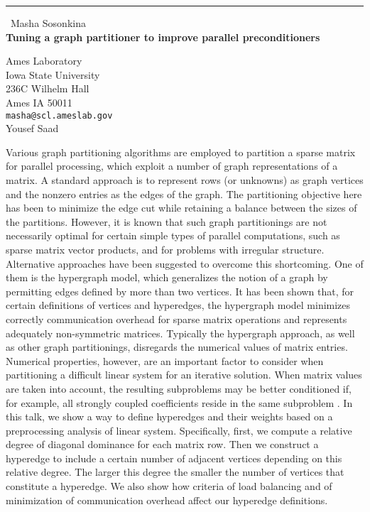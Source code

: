 \documentclass{report}
\begin{document}
\begin{center}
\rule{6in}{1pt} \
{\large Masha Sosonkina \\
{\bf Tuning a graph partitioner to improve parallel preconditioners}}

Ames Laboratory  \\ Iowa State University \\ 236C Wilhelm Hall \\ Ames IA 50011
\\
{\tt masha@scl.ameslab.gov}\\
Yousef Saad\end{center}

Various graph partitioning algorithms are employed to partition a
sparse matrix for parallel processing, which exploit a number of graph
representations of a matrix. A standard approach is to represent rows
(or unknowns) as graph vertices and the nonzero entries as the edges
of the graph. The partitioning objective here has been to minimize the
edge cut while retaining a balance between the sizes of the
partitions. However, it is known \cite{hendrickson00graph} that such
graph partitionings are not necessarily optimal for certain simple
types of parallel computations, such as sparse matrix vector
products, and for problems with irregular structure.
Alternative approaches have been suggested to overcome this
shortcoming.
One of them is the hypergraph model, which generalizes the notion of a
graph by permitting edges defined by more than two vertices.
It has been shown that, for certain definitions of vertices and
hyperedges, the hypergraph model minimizes correctly
communication overhead for sparse matrix operations and
represents adequately non-symmetric matrices. Typically the
hypergraph approach, as well as other graph partitionings, disregards
the numerical values of matrix entries.
Numerical properties, however, are an important factor to
consider when partitioning a difficult linear system for an iterative
solution.
When matrix values are taken into account, the resulting subproblems may
be better conditioned if, for example, all strongly coupled coefficients
reside in the same subproblem \cite{saad-sosonkina-acpc99}. In this
talk, we show a way to define hyperedges and their weights based
on a preprocessing analysis of linear system. Specifically, first,
we compute a relative degree of diagonal dominance for each matrix
row. Then we construct a hyperedge to include a certain number of
adjacent vertices depending on this relative degree. The larger this
degree the smaller the number of vertices that constitute a
hyperedge. We also show how criteria of load
balancing and of minimization of communication overhead affect our
hyperedge definitions.
\end{document}

